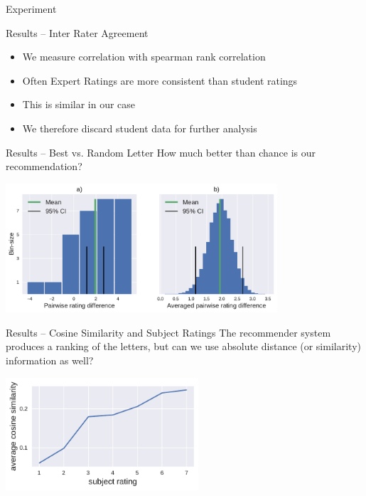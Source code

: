 \documentclass[10pt]{beamer}
\begin{document}
\begin{frame}{Experiment}
	
	
\end{frame}


\begin{frame}{Results -- Inter Rater Agreement}
	\begin{itemize}
	\item We measure correlation with spearman rank correlation
	\item Often Expert Ratings are more consistent than student ratings
	\item This is similar in our case
	\item We therefore discard student data for further analysis
	\end{itemize}
\end{frame}


\begin{frame}{Results -- Best vs. Random Letter}
	How much better than chance is our recommendation?
	\begin{center}
		\includegraphics[height=4.8cm]{both_diff_tf}
	\end{center}
\end{frame}


\begin{frame}{Results -- Cosine Similarity and Subject Ratings}
	The recommender system produces a ranking of the letters, but can we use absolute distance (or similarity) information as well?
	
	\begin{center}
		\includegraphics[height=4.2cm]{rating_vs_sim_mean}
	\end{center}
	
\end{frame}
\end{document}
